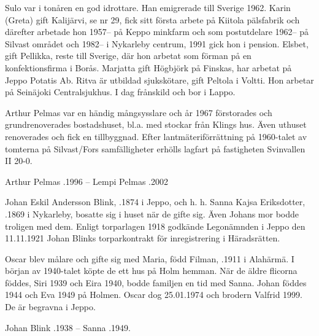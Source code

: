Sulo var i tonåren en god idrottare. Han emigrerade till Sverige 1962. Karin (Greta) gift Kalijärvi, se nr 29, fick sitt första arbete på Kiitola pälsfabrik och därefter arbetade hon 1957-- på Keppo minkfarm och som postutdelare 1962-- på Silvast området och 1982-- i Nykarleby centrum, 1991 gick hon i pension. Elsbet, gift Pellikka, reste till Sverige, där hon arbetat som förman på en konfektionsfirma i Borås. Marjatta gift Högbjörk på Finskas, har arbetat på Jeppo Potatis Ab. Ritva är utbildad sjukskötare, gift Peltola i Voltti. Hon arbetar på Seinäjoki Centralsjukhus. I dag frånskild och bor i Lappo.

Arthur Pelmas var en händig mångsysslare och år 1967 förstorades och grundrenoverades bostadshuset, bl.a. med stockar från Klings hus. Även uthuset renoverades och fick en tillbyggnad. Efter lantmäteriförrättning på 1960-talet av tomterna på Silvast/Fors samfälligheter erhölls lagfart på fastigheten Svinvallen II 20-0.

Arthur Pelmas .1996  --  Lempi Pelmas .2002


Johan Eskil Andersson Blink, .1874 i Jeppo, och h. h. Sanna Kajsa Eriksdotter, .1869 i Nykarleby, bosatte sig i huset när de gifte sig. Även Johans mor bodde troligen med dem. Enligt torparlagen 1918 godkände Legonämnden i Jeppo den 11.11.1921 Johan Blinks torparkontrakt för inregistrering i Häradsrätten.
\begin{jhchildren}
  \item {}
  \item {}
  \item {}
  \item {}
  \item {}
\end{jhchildren}
Oscar blev målare och gifte sig med Maria, född Filman, .1911 i Alahärmä. I början av 1940-talet köpte de ett hus på Holm hemman. När de äldre flicorna föddes, Siri 1939 och Eira 1940, bodde familjen en tid med Sanna. Johan föddes 1944 och Eva 1949 på Holmen. Oscar dog 25.01.1974 och brodern Valfrid 1999. De är begravna i Jeppo.

Johan Blink .1938  --  Sanna .1949.


